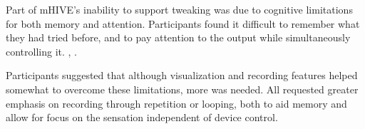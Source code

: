 Part of mHIVE's inability to support tweaking was due to cognitive limitations for both memory and attention.
Participants found it difficult to remember what they had tried before, %
and to pay attention to the output %
while simultaneously controlling it. %
,
	.


Participants suggested that although %
visualization and recording features helped somewhat %
to overcome these limitations, more was needed. %
All  requested greater emphasis on recording through repetition or looping, both to aid memory and allow for focus on the sensation independent of device control. 

